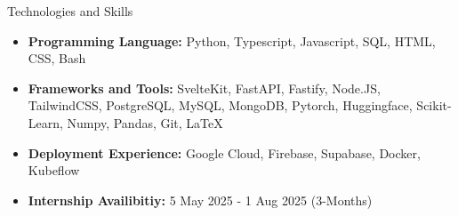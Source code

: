 \documentclass[]{mcdowellcv}
\begin{document}
	\begin{cvsection}{Technologies and Skills}
		\begin{cvsubsection}{}{}{}	
			\begin{itemize}
				\item \textbf{Programming Language: } Python, Typescript, Javascript, SQL, HTML, CSS, Bash
				\item \textbf{Frameworks and Tools: } SvelteKit, FastAPI, Fastify, Node.JS, TailwindCSS, PostgreSQL, MySQL, MongoDB, Pytorch, Huggingface, Scikit-Learn, Numpy, Pandas, Git, \LaTeX
				\item \textbf{Deployment Experience: } Google Cloud, Firebase, Supabase, Docker, Kubeflow
				\item \textbf{Internship Availibitiy: } 5 May 2025 - 1 Aug 2025 (3-Months)
			\end{itemize}
		\end{cvsubsection}
	\end{cvsection}
	
\end{document}
